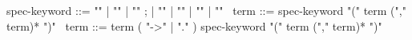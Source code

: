 \begin{syntax}
spec-keyword ::= "\requires" | "\ensures" | "\assigns"  ;
    | "\allocates" | "\frees" | "\throws" | "\exits" 
\
term ::= spec-keyword "(" term ("," term)* ")" 
\
term ::= term ( "->" | "." ) spec-keyword "(" term ("," term)* ")" 
\end{syntax}
